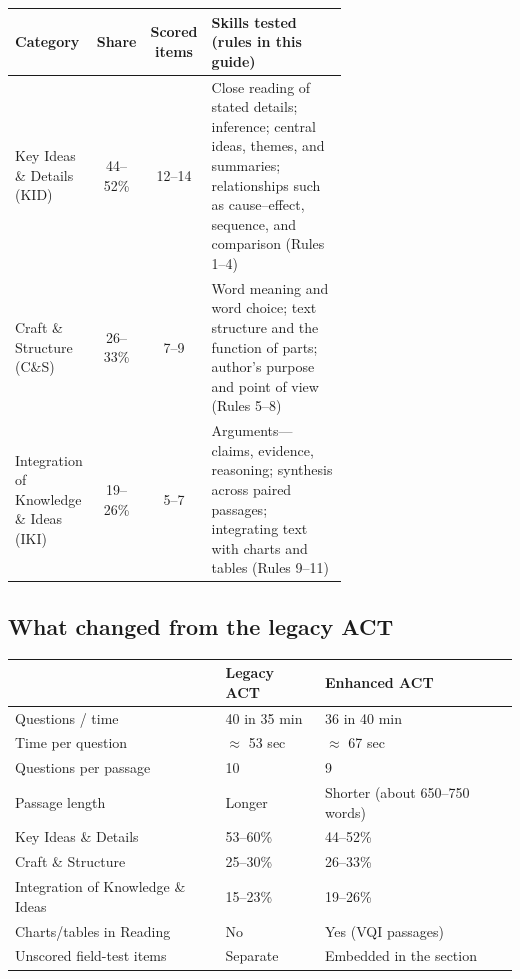 \documentclass[11pt]{article}
\begin{document}
\begin{center}
\small
\begin{tabular}{@{}p{0.22\linewidth}ccp{0.44\linewidth}@{}}
\toprule
\textbf{Category} & \textbf{Share} & \textbf{Scored items} & \textbf{Skills tested (rules in this guide)}\\
\midrule
Key Ideas \& Details (KID) & 44--52\% & 12--14 & Close reading of stated details; inference; central ideas, themes, and summaries; relationships such as cause--effect, sequence, and comparison (Rules 1--4)\\
\addlinespace
Craft \& Structure (C\&S) & 26--33\% & 7--9 & Word meaning and word choice; text structure and the function of parts; author's purpose and point of view (Rules 5--8)\\
\addlinespace
Integration of Knowledge \& Ideas (IKI) & 19--26\% & 5--7 & Arguments---claims, evidence, reasoning; synthesis across paired passages; integrating text with charts and tables (Rules 9--11)\\
\bottomrule
\end{tabular}
\end{center}

\subsection{What changed from the legacy ACT}
\begin{center}
\small
\begin{tabular}{@{}lll@{}}
\toprule
& \textbf{Legacy ACT} & \textbf{Enhanced ACT}\\
\midrule
Questions / time & 40 in 35 min & 36 in 40 min\\
Time per question & $\approx$ 53 sec & $\approx$ 67 sec\\
Questions per passage & 10 & 9\\
Passage length & Longer & Shorter (about 650--750 words)\\
Key Ideas \& Details & 53--60\% & 44--52\%\\
Craft \& Structure & 25--30\% & 26--33\%\\
Integration of Knowledge \& Ideas & 15--23\% & 19--26\%\\
Charts/tables in Reading & No & Yes (VQI passages)\\
Unscored field-test items & Separate & Embedded in the section\\
\bottomrule
\end{tabular}
\end{center}
\end{document}
